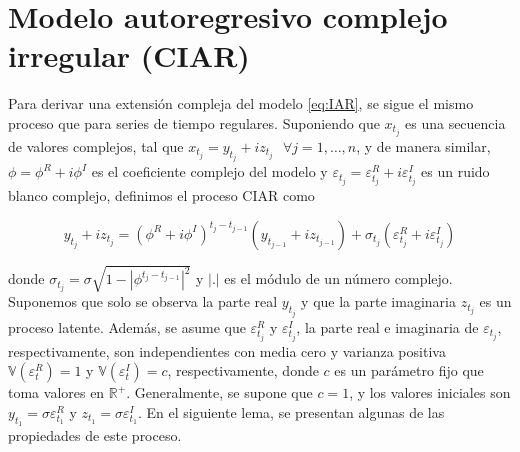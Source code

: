 


\section{Modelo autoregresivo complejo irregular (CIAR)}

Para derivar una extensión compleja del modelo \ref{eq:IAR}, se sigue el mismo proceso que para series de tiempo regulares. Suponiendo que $x_{t_{j}}$ es una secuencia de valores complejos, 
tal que $x_{t_{j}}=y_{t_{j}}+i z_{t_{j}} \text{ } \forall j=1, \ldots, n$, y de manera similar, $\phi=\phi^{R}+i \phi^{I}$ es el coeficiente complejo del modelo 
y $\varepsilon_{t_{j}}=\varepsilon_{t_{j}}^{R}+i \varepsilon_{t_{j}}^{I}$ es un ruido blanco complejo, definimos el proceso CIAR como

\begin{equation}
	y_{t_{j}}+i z_{t_{j}}=\left(\phi^{R}+i \phi^{I}\right)^{t_{j}-t_{j-1}}\left(y_{t_{j-1}}+i z_{t_{j-1}}\right)+\sigma_{t_{j}}\left(\varepsilon_{t_{j}}^{R}+i \varepsilon_{t_{j}}^{I}\right)
	\label{eq:CIAR}
\end{equation}

donde $\sigma_{t_{j}}=\sigma \sqrt{1-\left|\phi^{t_{j}-t_{j-1}}\right|^{2}}$ y $|$.$|$ es el módulo de un número complejo. 
Suponemos que solo se observa la parte real $y_{t_{j}}$ y que la parte imaginaria $z_{t_{j}}$ es un proceso latente. Además, se asume que $\varepsilon_{t_{j}}^{R}$ y $\varepsilon_{t_{j}}^{I}$, 
la parte real e imaginaria de $\varepsilon_{t_{j}}$, respectivamente, son independientes con media cero y varianza positiva $\mathbb{V}\left(\varepsilon_{t}^{R}\right)=1$ y $\mathbb{V}\left(\varepsilon_{t}^{I}\right)=c$, 
respectivamente, donde $c$ es un parámetro fijo que toma valores en $\mathbb{R}^{+}$. Generalmente, se supone que $c=1$, y los valores iniciales son $y_{t_{1}}=\sigma \varepsilon_{t_{1}}^{R}$ y $z_{t_{1}}=\sigma \varepsilon_{t_{1}}^{I}$.
En el siguiente lema, se presentan algunas de las propiedades de este proceso.

